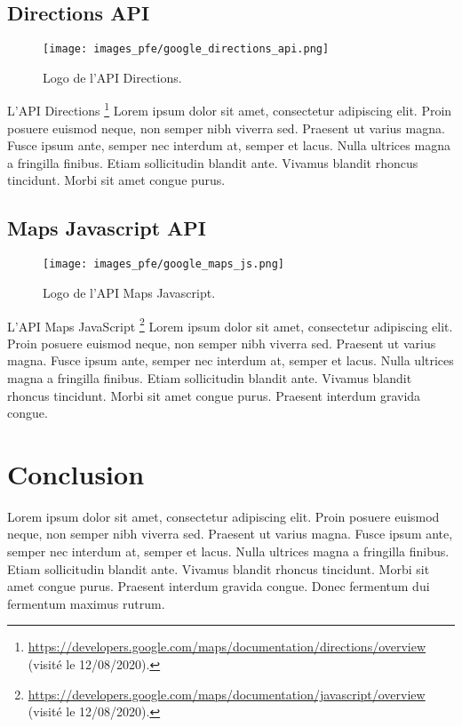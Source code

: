\vspace{1cm}

\subsection*{Directions API}
\begin{wrapfigure}[6]{r}{0.3\textwidth}
  \centering
  \texttt{[image: images\_pfe/google\_directions\_api.png]}
  \caption{Logo de l'API Directions.}
\end{wrapfigure}
\FloatBarrier
L'API Directions \footnote{\url{https://developers.google.com/maps/documentation/directions/overview} (visité le 12/08/2020).} Lorem ipsum dolor sit amet, consectetur adipiscing elit. Proin posuere euismod neque, non semper nibh viverra sed. Praesent ut varius magna. Fusce ipsum ante, semper nec interdum at, semper et lacus. Nulla ultrices magna a fringilla finibus. Etiam sollicitudin blandit ante. Vivamus blandit rhoncus tincidunt. Morbi sit amet congue purus. 

\vspace{1cm}

\subsection*{Maps Javascript API}
\begin{wrapfigure}[6]{r}{0.3\textwidth}
  \centering
  \texttt{[image: images\_pfe/google\_maps\_js.png]}
  \caption{Logo de l'API Maps Javascript.}
\end{wrapfigure}
\FloatBarrier
L'API Maps JavaScript \footnote{\url{https://developers.google.com/maps/documentation/javascript/overview} (visité le 12/08/2020).} Lorem ipsum dolor sit amet, consectetur adipiscing elit. Proin posuere euismod neque, non semper nibh viverra sed. Praesent ut varius magna. Fusce ipsum ante, semper nec interdum at, semper et lacus. Nulla ultrices magna a fringilla finibus. Etiam sollicitudin blandit ante. Vivamus blandit rhoncus tincidunt. Morbi sit amet congue purus. Praesent interdum gravida congue. 

\vspace{1cm}

\section{Conclusion}
Lorem ipsum dolor sit amet, consectetur adipiscing elit. Proin posuere euismod neque, non semper nibh viverra sed. Praesent ut varius magna. Fusce ipsum ante, semper nec interdum at, semper et lacus. Nulla ultrices magna a fringilla finibus. Etiam sollicitudin blandit ante. Vivamus blandit rhoncus tincidunt. Morbi sit amet congue purus. Praesent interdum gravida congue. Donec fermentum dui fermentum maximus rutrum.














